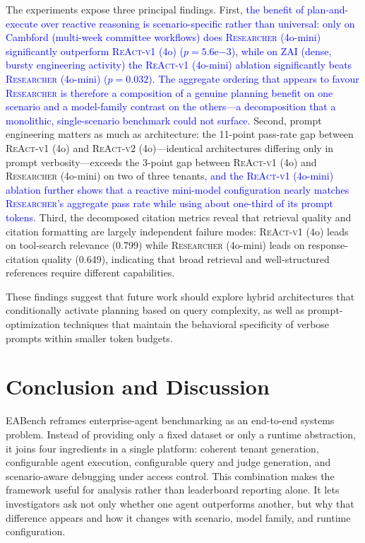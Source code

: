 \documentclass[journal,dvipsnames]{acmart}
\begin{document}
The experiments expose three principal findings. First, \textcolor{blue}{the benefit of plan-and-execute over reactive reasoning is scenario-specific rather than universal: only on Cambford (multi-week committee workflows) does \textsc{Researcher} (4o-mini) significantly outperform \textsc{ReAct-v1} (4o) ($p{=}5.6\mathrm{e}{-3}$), while on ZAI (dense, bursty engineering activity) the \textsc{ReAct-v1} (4o-mini) ablation significantly beats \textsc{Researcher} (4o-mini) ($p{=}0.032$). The aggregate ordering that appears to favour \textsc{Researcher} is therefore a composition of a genuine planning benefit on one scenario and a model-family contrast on the others---a decomposition that a monolithic, single-scenario benchmark could not surface.} Second, prompt engineering matters as much as architecture: the 11-point pass-rate gap between \textsc{ReAct-v1} (4o) and \textsc{ReAct-v2} (4o)---identical architectures differing only in prompt verbosity---exceeds the 3-point gap between \textsc{ReAct-v1} (4o) and \textsc{Researcher} (4o-mini) on two of three tenants\textcolor{blue}{, and the \textsc{ReAct-v1} (4o-mini) ablation further shows that a reactive mini-model configuration nearly matches \textsc{Researcher}'s aggregate pass rate while using about one-third of its prompt tokens}. Third, the decomposed citation metrics reveal that retrieval quality and citation formatting are largely independent failure modes: \textsc{ReAct-v1} (4o) leads on tool-search relevance (0.799) while \textsc{Researcher} (4o-mini) leads on response-citation quality (0.649), indicating that broad retrieval and well-structured references require different capabilities.

These findings suggest that future work should explore hybrid architectures that conditionally activate planning based on query complexity, as well as prompt-optimization techniques that maintain the behavioral specificity of verbose prompts within smaller token budgets.

\section{Conclusion and Discussion}
\label{sec:conclusion}

EABench reframes enterprise-agent benchmarking as an end-to-end systems problem. Instead of providing only a fixed dataset or only a runtime abstraction, it joins four ingredients in a single platform: coherent tenant generation, configurable agent execution, configurable query and judge generation, and scenario-aware debugging under access control. This combination makes the framework useful for analysis rather than leaderboard reporting alone. It lets investigators ask not only whether one agent outperforms another, but why that difference appears and how it changes with scenario, model family, and runtime configuration.
\end{document}
